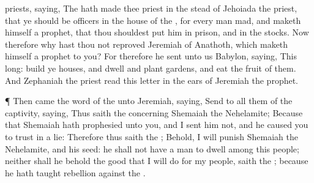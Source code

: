 {priests,
saying,
The
{} hath
made thee
priest in the stead of
Jehoiada the
priest, that ye should be
officers in the
house of the
{}, for every
man
{}
mad, and maketh himself a
prophet, that thou shouldest
put him in
prison, and in the
stocks.
Now therefore why hast thou not
reproved
Jeremiah of
Anathoth, which maketh himself a
prophet to you?
For therefore he
sent unto us
{}
Babylon,
saying,
This
{}
long:
build ye
houses, and
dwell
{} and
plant
gardens, and
eat the
fruit of them.
And
Zephaniah the
priest
read this
letter in the
ears of
Jeremiah the
prophet.
\par }{\PP {}¶ Then came the
word of the
{} unto
Jeremiah,
saying,
Send to all them of the
captivity,
saying, Thus
saith the
{} concerning
Shemaiah the
Nehelamite; Because that
Shemaiah hath
prophesied unto you, and I
sent him not, and he caused you to
trust in a
lie:
Therefore thus
saith the
{}; Behold, I will
punish
Shemaiah the
Nehelamite, and his
seed: he shall not have a
man to
dwell
among this
people; neither shall he
behold the
good that I will
do for my
people,
saith the
{}; because he hath
taught
rebellion against the
{}.

}
